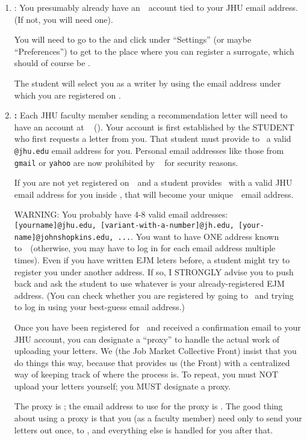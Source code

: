 \documentclass{\econtex}
\begin{document}
\begin{enumerate}

\item \textbf{\AEAref}:
  You presumably already have an~{\AEARecLink}~account tied to your JHU email address.  (If not, you will need one).

  You will need to go to the \AEARecLink and click under ``Settings'' (or maybe ``Preferences'') to get to the place where you can register a surrogate, which should of course be \jmstaffemail.

  The student will select you as a writer by using the email address under which you are registered on \AEALink.
  
  
\item \textbf{\EJM:} Each JHU faculty member sending a recommendation letter will need to have an account at \EJM ~ (\EJMLink). Your account is first established by the STUDENT who first requests a letter from you. That student must provide to \EJM~a valid \texttt{@jhu.edu} email address for you.  Personal email addresses like those from \texttt{gmail} or \texttt{yahoo} are now prohibited by \EJM~ for security reasons. 

  \medskip
  If you are not yet registered on~\EJM~and a student provides \EJM~with a valid JHU email address for you inside \EJM, that will become your unique~\EJM~email address.

  WARNING: You probably have 4-8 valid email addresses: \texttt{[yourname]@jhu.edu, [variant-with-a-number]@jh.edu, [your-name]@johnshopkins.edu, ...}.  You want to have ONE address known to~{\EJM}~(otherwise, you may have to log in for each email address multiple times).  Even if you have written EJM leters before, a student might try to register you under another address.  If so, I STRONGLY advise you to push back and ask the student to use whatever is your already-registered EJM address.  (You can check whether you are registered by going to {\EJM}~and trying to log in using your best-guess email address.)

  Once you have been registered for \EJM~and received a confirmation email to your JHU account, you can designate a ``proxy'' to handle the actual work of uploading your letters.  We (the Job Market Collective Front) insist that you do things this way, because that provides us (the Front) with a centralized way of keeping track of where the process is.  To repeat, you must NOT upload your letters yourself; you MUST designate a proxy.

  The proxy is {\JMStaffName} \JMStaffNameLast; the email address to use for the proxy is
  \jmstaffemail.  The good thing about using a proxy is that you (as a faculty member)
  need only to send your letters out once, to \jmstaffemail, and everything 
  else is handled for you after that. %


\end{enumerate}
\end{document}
